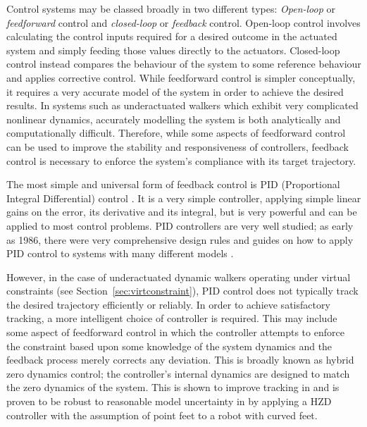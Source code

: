 Control systems may be classed broadly in two different types: \textit{Open-loop} or \textit{feedforward} control and \textit{closed-loop} or \textit{feedback} control. Open-loop control involves calculating the control inputs required for a desired outcome in the actuated system and simply feeding those values directly to the actuators. Closed-loop control instead compares the behaviour of the system to some reference behaviour and applies corrective control. While feedforward control is simpler conceptually, it requires a very accurate model of the system in order to achieve the desired results. In systems such as underactuated walkers which exhibit very complicated nonlinear dynamics, accurately modelling the system is both analytically and computationally difficult. Therefore, while some aspects of feedforward control can be used to improve the stability and responsiveness of controllers, feedback control is necessary to enforce the system's compliance with its target trajectory.

The most simple and universal form of feedback control is PID (Proportional Integral Differential) control \cite{aastrom2001future}. It is a very simple controller, applying simple linear gains on the error, its derivative and its integral, but is very powerful and can be applied to most control problems. PID controllers are very well studied; as early as 1986, there were very comprehensive design rules and guides on how to apply PID control to systems with many different models \cite{rivera1986internal}. %

However, in the case of underactuated dynamic walkers operating under virtual constraints (see Section~\ref{sec:virtconstraint}), PID control does not typically track the desired trajectory efficiently or reliably. In order to achieve satisfactory tracking, a more intelligent choice of controller is required. This may include some aspect of feedforward control in which the controller attempts to enforce the constraint based upon some knowledge of the system dynamics and the feedback process merely corrects any deviation. This is broadly known as hybrid zero dynamics control; the controller's internal dynamics are designed to match the zero dynamics of the system. This is shown to improve tracking in \cite{sreenath2011compliant} and is proven to be robust to reasonable model uncertainty in \cite{martin2014design} by applying a HZD controller with the assumption of point feet to a robot with curved feet. 


